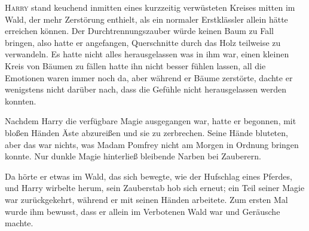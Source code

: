 
\lettrine{H}{arry} stand keuchend inmitten eines kurzzeitig verwüsteten Kreises mitten im Wald, der mehr Zerstörung enthielt, als ein normaler Erstklässler allein hätte erreichen können. Der Durchtrennungszauber würde keinen Baum zu Fall bringen, also hatte er angefangen, Querschnitte durch das Holz teilweise zu verwandeln. Es hatte nicht alles herausgelassen was in ihm war, einen kleinen Kreis von Bäumen zu fällen hatte ihn nicht besser fühlen lassen, all die Emotionen waren immer noch da, aber während er Bäume zerstörte, dachte er wenigstens nicht darüber nach, dass die Gefühle nicht herausgelassen werden konnten.

Nachdem Harry die verfügbare Magie ausgegangen war, hatte er begonnen, mit bloßen Händen Äste abzureißen und sie zu zerbrechen. Seine Hände bluteten, aber das war nichts, was Madam Pomfrey nicht am Morgen in Ordnung bringen konnte. Nur dunkle Magie hinterließ bleibende Narben bei Zauberern.

Da hörte er etwas im Wald, das sich bewegte, wie der Hufschlag eines Pferdes, und Harry wirbelte herum, sein Zauberstab hob sich erneut; ein Teil seiner Magie war zurückgekehrt, während er mit seinen Händen arbeitete. Zum ersten Mal wurde ihm bewusst, dass er allein im Verbotenen Wald war und Geräusche machte.


